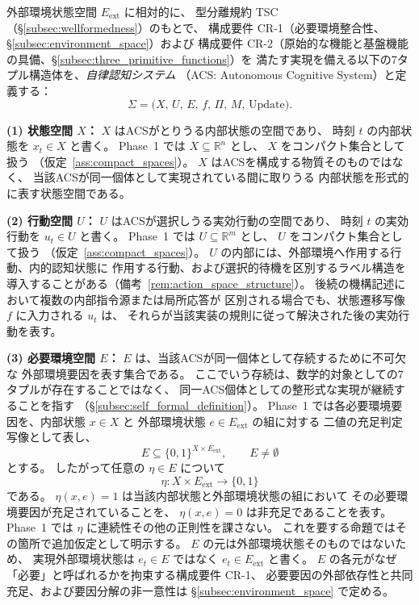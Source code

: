 \begin{definition}[自律認知システム]
\label{def:acs}
外部環境状態空間 $E_{\mathrm{ext}}$ に相対的に、
型分離規約 TSC（\S\ref{subsec:wellformedness}）のもとで、
構成要件 CR-1（必要環境整合性、\S\ref{subsec:environment_space}）および
構成要件 CR-2（原始的な機能と基盤機能の具備、\S\ref{subsec:three_primitive_functions}）を
満たす実現を備える以下の7タプル構造体を、\emph{自律認知システム}
（ACS: Autonomous Cognitive System）と定義する：
\[
  \Sigma
  =
  \bigl(
    X,\,
    U,\,
    E,\,
    f,\,
    \Pi,\,
    M,\,
    \mathrm{Update}
  \bigr).
\]

\medskip
\noindent\textbf{(1) 状態空間 $X$：}
$X$ はACSがとりうる内部状態の空間であり、
時刻 $t$ の内部状態を $x_t\in X$ と書く。
Phase~1 では $X\subseteq\mathbb{R}^n$ とし、
$X$ をコンパクト集合として扱う
（仮定~\ref{ass:compact_spaces}）。
$X$ はACSを構成する物質そのものではなく、
当該ACSが同一個体として実現されている間に取りうる
内部状態を形式的に表す状態空間である。

\medskip
\noindent\textbf{(2) 行動空間 $U$：}
$U$ はACSが選択しうる実効行動の空間であり、
時刻 $t$ の実効行動を $u_t\in U$ と書く。
Phase~1 では $U\subseteq\mathbb{R}^m$ とし、
$U$ をコンパクト集合として扱う
（仮定~\ref{ass:compact_spaces}）。
$U$ の内部には、外部環境へ作用する行動、内的認知状態に
作用する行動、および選択的待機を区別するラベル構造を
導入することがある（備考~\ref{rem:action_space_structure}）。
後続の機構記述において複数の内部指令源または局所応答が
区別される場合でも、状態遷移写像 $f$ に入力される $u_t$ は、
それらが当該実装の規則に従って解決された後の実効行動を表す。

\medskip
\noindent\textbf{(3) 必要環境空間 $E$：}
$E$ は、当該ACSが同一個体として存続するために不可欠な
外部環境要因を表す集合である。
ここでいう存続は、数学的対象としての7タプルが存在することではなく、
同一ACS個体としての整形式な実現が継続することを指す
（\S\ref{subsec:self_formal_definition}）。
Phase~1 では各必要環境要因を、内部状態 $x\in X$ と
外部環境状態 $e\in E_{\mathrm{ext}}$ の組に対する
二値の充足判定写像として表し、
\[
  E
  \subseteq
  \{0,1\}^{X\times E_{\mathrm{ext}}},
  \qquad
  E\neq\emptyset
\]
とする。
したがって任意の $\eta\in E$ について
\[
  \eta:
  X\times E_{\mathrm{ext}}
  \longrightarrow
  \{0,1\}
\]
である。
$\eta(x,e)=1$ は当該内部状態と外部環境状態の組において
その必要環境要因が充足されていることを、
$\eta(x,e)=0$ は非充足であることを表す。
Phase~1 では $\eta$ に連続性その他の正則性を課さない。
これを要する命題ではその箇所で追加仮定として明示する。
$E$ の元は外部環境状態そのものではないため、
実現外部環境状態は $e_t\in E$ ではなく
$e_t\in E_{\mathrm{ext}}$ と書く。
$E$ の各元がなぜ「必要」と呼ばれるかを拘束する構成要件 CR-1、
必要要因の外部依存性と共同充足、および要因分解の非一意性は
\S\ref{subsec:environment_space} で定める。


\end{definition}
